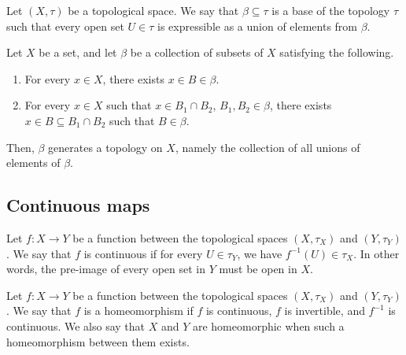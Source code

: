 \documentclass[11pt]{article}
\theoremstyle{definition}
\theoremstyle{remark}
\numberwithin{equation}{section}
\begin{document}
    \begin{definition}
        Let $(X, \tau)$ be a topological space. We say that $\beta \subseteq
        \tau$ is a base of the topology $\tau$ such that every open set $U \in \tau$
        is expressible as a union of elements from $\beta$. 
    \end{definition}

    \begin{definition}
        Let $X$ be a set, and let $\beta$ be a collection of subsets of $X$
        satisfying the following.
        \begin{enumerate}
            \itemsep0em
            \item For every $x \in X$, there exists $x \in B \in \beta$.
            \item For every $x \in X$ such that $x \in B_1 \cap B_2$, $B_1, B_2 \in
            \beta$, there exists $x \in B \subseteq B_1 \cap B_2$ such that $B \in
            \beta$.
        \end{enumerate}
        Then, $\beta$ generates a topology on $X$, namely the collection of all
        unions of elements of $\beta$.
    \end{definition}


    \subsection{Continuous maps}

    \begin{definition}
        Let $f\colon X \to Y$ be a function between the topological spaces $(X,
        \tau_X)$ and $(Y, \tau_Y)$. We say that $f$ is continuous if for every $U
        \in \tau_Y$, we have $f^{-1}(U) \in \tau_X$. In other words, the pre-image of
        every open set in $Y$ must be open in $X$.
    \end{definition}

    \begin{definition}
        Let $f\colon X \to Y$ be a function between the topological spaces $(X,
        \tau_X)$ and $(Y, \tau_Y)$. We say that $f$ is a homeomorphism if $f$ is
        continuous, $f$ is invertible, and $f^{-1}$ is continuous. We also say that
        $X$ and $Y$ are homeomorphic when such a homeomorphism between them exists.
    \end{definition}
\end{document}
